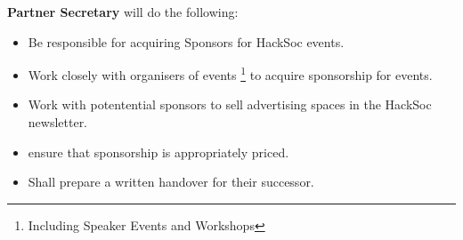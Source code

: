 \item \textbf{Partner Secretary} will do the following:
\begin{itemize}
	\item Be responsible for acquiring Sponsors for HackSoc events.
	\item Work closely with organisers of events \footnote{Including Speaker Events and Workshops} to acquire sponsorship for events.
	\item Work with potentential sponsors to sell advertising spaces in the HackSoc newsletter.
	\item ensure that sponsorship is appropriately priced.
	\item Shall prepare a written handover for their successor.
\end{itemize}
